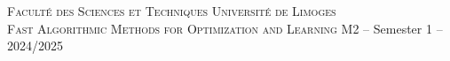 \documentclass[11pt,a4paper]{article}
\begin{document}
\thispagestyle{empty}

\begin{center}

  \textsc{Facult\'e des Sciences et Techniques}  \hfill \textsc{Universit\'e de Limoges} \\
  \textsc{Fast Algorithmic Methods for Optimization and Learning} \hfill M2 -- Semester 1 -- 2024/2025 \\
  \bigskip

\end{center}



\printbibliography
\end{document}
